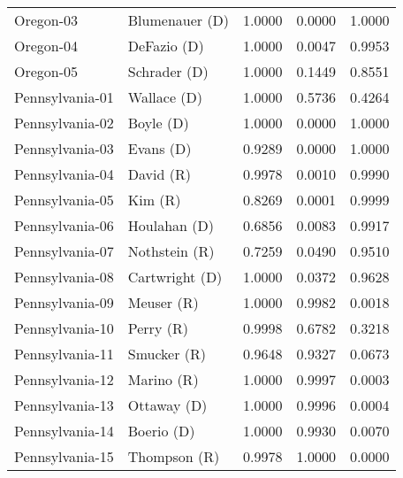 \begin{longtable}{llrll}
         Oregon-03 &      {\color{Blue} Blumenauer (D)} &       1.0000 &        0.0000 &        1.0000 \\
         Oregon-04 &         {\color{Blue} DeFazio (D)} &       1.0000 &        0.0047 &        0.9953 \\
         Oregon-05 &        {\color{Blue} Schrader (D)} &       1.0000 &        0.1449 &        0.8551 \\
   Pennsylvania-01 &         {\color{Blue} Wallace (D)} &       1.0000 &        0.5736 &        0.4264 \\
   Pennsylvania-02 &           {\color{Blue} Boyle (D)} &       1.0000 &        0.0000 &        1.0000 \\
   Pennsylvania-03 &           {\color{Blue} Evans (D)} &       0.9289 &        0.0000 &        1.0000 \\
   Pennsylvania-04 &            {\color{Red} David (R)} &       0.9978 &        0.0010 &        0.9990 \\
   Pennsylvania-05 &              {\color{Red} Kim (R)} &       0.8269 &        0.0001 &        0.9999 \\
   Pennsylvania-06 &        {\color{Blue} Houlahan (D)} &       0.6856 &        0.0083 &        0.9917 \\
   Pennsylvania-07 &        {\color{Red} Nothstein (R)} &       0.7259 &        0.0490 &        0.9510 \\
   Pennsylvania-08 &      {\color{Blue} Cartwright (D)} &       1.0000 &        0.0372 &        0.9628 \\
   Pennsylvania-09 &           {\color{Red} Meuser (R)} &       1.0000 &        0.9982 &        0.0018 \\
   Pennsylvania-10 &            {\color{Red} Perry (R)} &       0.9998 &        0.6782 &        0.3218 \\
   Pennsylvania-11 &          {\color{Red} Smucker (R)} &       0.9648 &        0.9327 &        0.0673 \\
   Pennsylvania-12 &           {\color{Red} Marino (R)} &       1.0000 &        0.9997 &        0.0003 \\
   Pennsylvania-13 &         {\color{Blue} Ottaway (D)} &       1.0000 &        0.9996 &        0.0004 \\
   Pennsylvania-14 &          {\color{Blue} Boerio (D)} &       1.0000 &        0.9930 &        0.0070 \\
   Pennsylvania-15 &         {\color{Red} Thompson (R)} &       0.9978 &        1.0000 &        0.0000 \\

\end{longtable}
